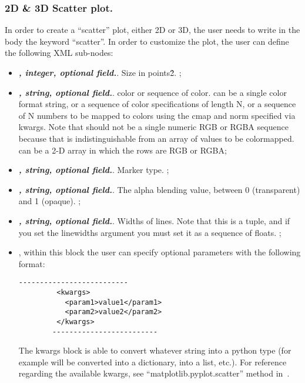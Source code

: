 \subsubsection{2D \& 3D Scatter plot.}
In order to create a ``scatter'' plot, either 2D or 3D, the user needs to write
in the  body the keyword ``scatter''.
%
In order to customize the plot, the user can define the following XML sub-nodes:
  \begin{itemize}
  \item {}\textbf{\textit{, integer, optional field.}}.
  Size in points\^2.
  ;
  \item {}\textbf{\textit{, string, optional field.}}.
  color or sequence of color.
   can be a single color format string, or a sequence of color
  specifications of length N, or a sequence of N numbers to be mapped to colors
  using the cmap and norm specified via kwargs.
  Note that  should not be a single numeric RGB or RGBA sequence because
  that is indistinguishable from an array of values to be colormapped.
   can be a 2-D array in which the rows are RGB or RGBA;
  \item {}\textbf{\textit{, string, optional field.}}.
  Marker type.
  ;
  \item {}\textbf{\textit{, string, optional field.}}.
  The alpha blending value, between 0 (transparent) and 1 (opaque).
   ;
  \item {}\textbf{\textit{, string, optional field.}}.
  Widths of lines.
  Note that this is a tuple, and if you set the linewidths argument you must set
  it as a sequence of floats.
  ;
  \item \textit{}, within this block the user can specify optional
  parameters with the following format:
        \begin{lstlisting}[style=XML]
        --------------------------
         <kwargs>
           <param1>value1</param1>
           <param2>value2</param2>
         </kwargs>
        -------------------------
       \end{lstlisting}
  The kwargs block is able to convert whatever string into a python type (for
  example  will be converted into a
  dictionary,  into a list, etc.).
  For reference regarding the available kwargs, see
  ``matplotlib.pyplot.scatter'' method in~\cite{MatPlotLib}.
    \end{itemize}

